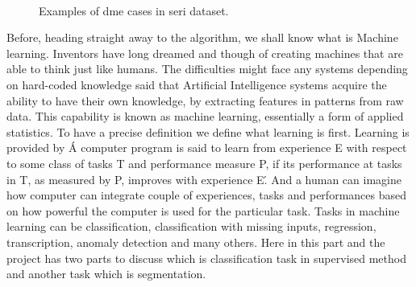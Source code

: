 \begin{figure}[t]
\begin{center}
    \
    \   
    \\
    
\end{center}
    \caption{Examples of \acs{dme} cases in \acs{seri} dataset.}
  \label{fig:bbdd}
\end{figure}

Before, heading straight away to the algorithm, we shall know what is Machine learning.
Inventors have long dreamed and though of creating machines that are able to think just like humans.
The difficulties might face any systems depending on hard-coded knowledge said that Artificial Intelligence systems acquire the ability to have their own knowledge, by extracting features in patterns from raw data.
This capability is known as machine learning, essentially a form of applied statistics.
To have a precise definition we define what learning is first.
Learning is provided by \cite{mitchell1998introduction} \' A computer program is said to learn from experience E with respect to some class of tasks T and performance measure P, if its performance at tasks in T, as measured by P, improves with experience E\' .
And a human can imagine how computer can integrate couple of experiences, tasks and performances based on how powerful the computer is used for the particular task.
Tasks in machine learning can be classification, classiﬁcation with missing inputs, regression, transcription, anomaly detection and many others. 
Here in this part and the project has two parts to discuss which is classification task in supervised method and another task which is segmentation.

